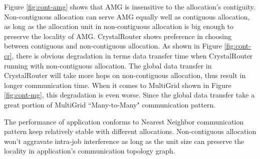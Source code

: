 \documentclass[conference]{IEEEtran}
\begin{document}
Figure \ref{fig:cont-amg} shows that AMG is insensitive to the allocation's contiguity. Non-contiguous allocation can serve AMG equally well as contiguous allocation, as long as the allocation unit in non-contiguous allocation is big enough to preserve the locality of AMG. CrystalRouter shows preference in choosing between contiguous and non-contiguous allocation. As shown in Figure \ref{fig:cont-cr}, there is obvious degradation in terms data transfer time when CrystalRouter running with non-contiguous allocation. The global data transfer in CrystalRouter will take more hops on non-contiguous allocation, thus result in longer communication time. When it comes to MultiGrid shown in Figure \ref{fig:cont-mg}, this degradation is even worse. Since the global data transfer take a great portion of MultiGrid ``Many-to-Many" communication pattern. 

The performance of application conforms to Nearest Neighbor communication pattern keep relatively stable with different allocations. Non-contiguous allocation won't aggravate intra-job interference as long as the unit size can preserve the locality in application's communication topology graph. 
\end{document}
